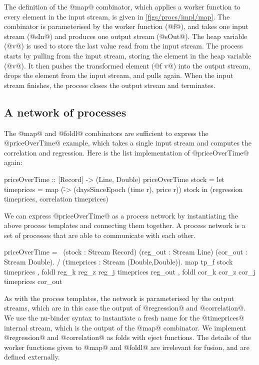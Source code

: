 The definition of the @map@ combinator, which applies a worker function to every element in the input stream, is given in \autoref{figs/procs/impl/map}.
The combinator is parameterised by the worker function (@f@), and takes one input stream (@sIn@) and produces one output stream (@sOut@).
The heap variable (@v@) is used to store the last value read from the input stream.
The process starts by pulling from the input stream, storing the element in the heap variable (@v@).
It then pushes the transformed element (@f v@) into the output stream, drops the element from the input stream, and pulls again.
When the input stream finishes, the process closes the output stream and terminates.

\subsection{A network of processes}
The @map@ and @foldl@ combinators are sufficient to express the @priceOverTime@ example, which takes a single input stream and computes the correlation and regression.
Here is the list implementation of @priceOverTime@ again:

\begin{haskell}
priceOverTime :: [Record] -> (Line, Double)
priceOverTime stock =
  let timeprices = map (\r -> (daysSinceEpoch (time r), price r)) stock
  in (regression timeprices, correlation timeprices)
\end{haskell}

We can express @priceOverTime@ as a process network by instantiating the above process templates and connecting them together.
A process network is a set of processes that are able to communicate with each other.

\begin{process}
priceOverTime =
  \ (stock : Stream Record)
    (reg_out : Stream Line) (cor_out : Stream Double).
  / (timeprices : Stream (Double,Double)).
     { map    tp_f             stock      timeprices
     , foldl reg_k reg_z reg_j timeprices reg_out
     , foldl cor_k cor_z cor_j timeprices cor_out }
\end{process}

As with the process templates, the network is parameterised by the output streams, which are in this case the output of @regression@ and @correlation@.
We use the nu-binder syntax to instantiate a fresh name for the @timeprices@ internal stream, which is the output of the @map@ combinator.
We implement @regression@ and @correlation@ as folds with eject functions.
The details of the worker functions given to @map@ and @foldl@ are irrelevant for fusion, and are defined externally.

